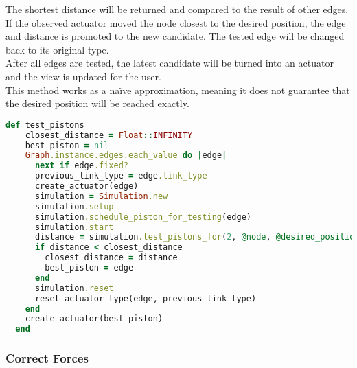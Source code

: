The shortest distance will be returned and compared to the result of other edges. If the observed actuator moved the node closest to the desired position, the edge and distance is promoted to the new candidate. The tested edge will be changed back to its original type.\\
After all edges are tested, the latest candidate will be turned into an actuator and the view is updated for the user.\\
This method works as a naïve approximation, meaning it does not guarantee that the desired position will be reached exactly.

\begin{lstlisting}[language=Ruby, label={lst:pose_check}, caption=The test\_piston method changes each edge into an actuator\, tests its movement and determines how close it brings a selected node to a desired position.]
  def test_pistons
    closest_distance = Float::INFINITY
    best_piston = nil
    Graph.instance.edges.each_value do |edge|
      next if edge.fixed?
      previous_link_type = edge.link_type
      create_actuator(edge)
      simulation = Simulation.new
      simulation.setup
      simulation.schedule_piston_for_testing(edge)
      simulation.start
      distance = simulation.test_pistons_for(2, @node, @desired_position)
      if distance < closest_distance
        closest_distance = distance
        best_piston = edge
      end
      simulation.reset
      reset_actuator_type(edge, previous_link_type)
    end
    create_actuator(best_piston)
  end
\end{lstlisting}

\subsubsection{Correct Forces}

